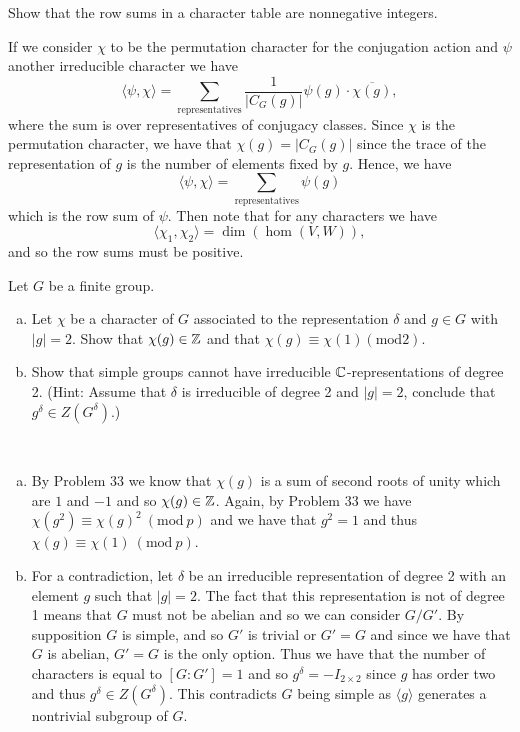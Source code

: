 \documentclass[leqno]{article}
\begin{document}
\newpage
\begin{problem} 
Show that the row sums in a character table are nonnegative integers.
\end{problem}
\begin{solution}
If we consider $\chi$ to be the permutation character for the conjugation action and $\psi$ another irreducible character we have
\[
\langle \psi, \chi \rangle = \sum_{\textrm{representatives}} \frac{1}{|C_G(g)|} \psi(g) \cdot \overline{\chi(g)},
\]
where the sum is over representatives of conjugacy classes.  Since $\chi$ is the permutation character, we have that $\chi(g)=|C_G(g)|$ since the trace of the representation of $g$ is the number of elements fixed by $g$. Hence, we have
\[
\langle \psi,\chi\rangle = \sum_{\textrm{representatives}} \psi(g)
\]
which is the row sum of $\psi$.  Then note that for any characters we have
\[
\langle \chi_1, \chi_2\rangle = \dim(\hom(V,W)),
\]
and so the row sums must be positive.
\end{solution}

\newpage
\begin{problem}
Let $G$ be a finite group.
\begin{enumerate}[(a)]
    \item Let $\chi$ be a character of $G$ associated to the representation $\delta$ and $g\in G$ with $|g|=2$. Show that $\chi(g)\in \mathbb{Z}$ and that $\chi(g)\equiv\chi(1) (\textrm{mod}2)$.
    \item Show that simple groups cannot have irreducible $\mathbb{C}$-representations of degree 2. (Hint: Assume that $\delta$ is irreducible of degree 2 and $|g|=2$, conclude that $g^\delta\in Z(G^\delta)$.)
\end{enumerate}
\end{problem}
\begin{solution}~
\begin{enumerate}[(a)]
    \item By Problem 33 we know that $\chi(g)$ is a sum of second roots of unity which are $1$ and $-1$ and so $\chi(g)\in \mathbb{Z}$.  Again, by Problem 33 we have $\chi(g^2)\equiv \chi(g)^2 ~(\textrm{mod}~p)$ and we have that $g^2=1$ and thus $\chi(g)\equiv \chi(1) ~(\textrm{mod}~p)$. 
    \item For a contradiction, let $\delta$ be an irreducible representation of degree 2 with an element $g$ such that $|g|=2$. The fact that this representation is not of degree 1 means that $G$ must not be abelian and so we can consider $G/G'$. By supposition $G$ is simple, and so $G'$ is trivial or $G'=G$ and since we have that $G$ is abelian, $G'=G$ is the only option.  Thus we have that the number of characters is equal to $[G:G']=1$ and so $g^\delta = -I_{2\times 2}$ since $g$ has order two and thus $g^{\delta}\in Z(G^\delta)$. This contradicts $G$ being simple as $\langle g\rangle$ generates a nontrivial subgroup of $G$.
\end{enumerate}
\end{solution}
\end{document}

